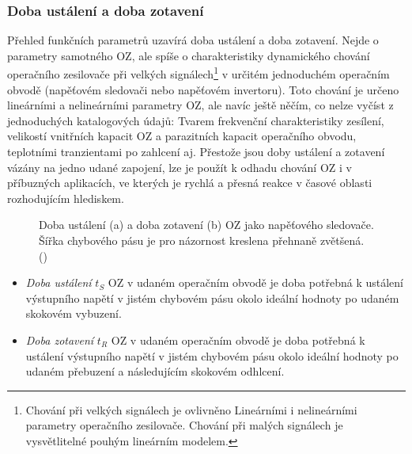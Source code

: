       \subsubsection{Doba ustálení a doba zotavení}\label{aesIchIIIsecIIssecVIII}
        Přehled funkčních parametrů uzavírá doba ustálení a doba zotavení. Nejde o parametry
        samotného OZ, ale spíše o charakteristiky dynamického chování operačního zesilovače při
        velkých signálech\footnote{Chování při velkých signálech je ovlivněno Lineárními i
        nelineárními parametry operačního zesilovače. Chování při malých signálech je vysvětlitelné
        pouhým lineárním modelem.} v určitém jednoduchém operačním obvodě (napěťovém sledovači nebo
        napěťovém invertoru). Toto chování je určeno lineárními a nelineárními parametry OZ, ale
        navíc ještě něčím, co nelze vyčíst z jednoduchých katalogových údajů: Tvarem frekvenční
        charakteristiky zesílení, velikostí vnitřních kapacit OZ a parazitních kapacit operačního
        obvodu, teplotními tranzientami po zahlcení aj. Přestože jsou doby ustálení a zotavení
        vázány na jedno udané zapojení, lze je použít k odhadu chování OZ i v příbuzných aplikacích,
        ve kterých je rychlá a přesná reakce v časové oblasti rozhodujícím hlediskem. 

        \begin{figure}[ht!]  %
          \centering
                \newline                                              
          \caption{Doba ustálení (a) a doba zotavení (b) OZ jako napěťového sledovače. Šířka
                   chybového pásu je pro názornost kreslena přehnaně zvětšená.
                   (\cite[s.~32]{Dostal})}
          \label{aes:fig059}
        \end{figure}

        \begin{itemize}[noitemsep]
          \item \emph{Doba ustálení} \(t_S\) OZ v udaném operačním obvodě je doba potřebná k
                ustálení výstupního napětí v jistém chybovém pásu okolo ideální hodnoty po udaném
                skokovém vybuzení.    
          \item \emph{Doba zotavení} \(t_R\) OZ v udaném operačním obvodě je doba potřebná k
                ustálení výstupního napětí v jistém chybovém pásu okolo ideální hodnoty po udaném
                přebuzení a následujícím skokovém odhlcení.      
        \end{itemize}

